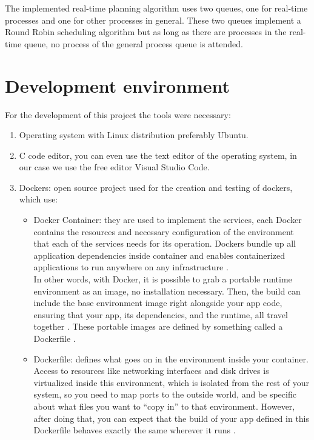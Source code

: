 \documentclass{article}
\begin{document}
The implemented real-time planning algorithm uses two queues, one for real-time processes and one for other processes in general. These two queues implement a Round Robin scheduling algorithm but as long as there are processes in the real-time queue, no process of the general process queue is attended.

\section{Development environment}
For the development of this project the tools were necessary:
\begin{enumerate}
    \item Operating system with Linux distribution preferably Ubuntu.
    \item C code editor, you can even use the text editor of the operating system, in our case we use the free editor Visual Studio Code.
    \item Dockers: open source project used for the creation and testing of dockers, which use:
    \begin{itemize}
        \item Docker Container: they are used to implement the services, each Docker contains the resources and necessary configuration of the environment that each of the services needs for its operation. Dockers bundle up all application dependencies inside container and enables containerized applications to run anywhere on any infrastructure \cite{DockerEngine}.\\
        In other words, with Docker, it is possible to grab a portable runtime environment as an image, no installation necessary. Then, the build can include the base environment image right alongside your app code, ensuring that your app, its dependencies, and the runtime, all travel together \cite{DockerContainer}.
        These portable images are defined by something called a Dockerfile \cite{DockerContainer}.
        \item Dockerfile: defines what goes on in the environment inside your container. Access to resources like networking interfaces and disk drives is virtualized inside this environment, which is isolated from the rest of your system, so you need to map ports to the outside world, and be specific about what files you want to “copy in” to that environment. However, after doing that, you can expect that the build of your app defined in this Dockerfile behaves exactly the same wherever it runs \cite{DockerContainer}.
    \end{itemize}
\end{enumerate}
\end{document}
